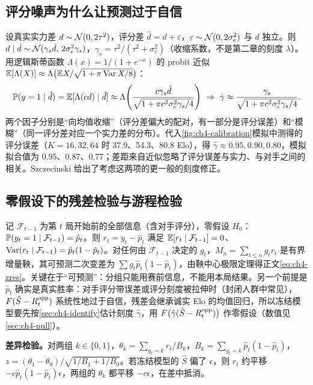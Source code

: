 \subsection{评分噪声为什么让预测过于自信}
\label{app:ch4-overconf}

设真实实力差 $d\sim\mathcal{N}(0,2\tau^2)$，评分差 $\hat d=d+\varepsilon$，$\varepsilon\sim\mathcal{N}(0,2\sigma_e^2)$ 与 $d$ 独立。则 $d\mid\hat d\sim\mathcal{N}(\gamma_s\hat d,\,2\sigma_e^2\gamma_s)$，$\gamma_s=\tau^2/(\tau^2+\sigma_e^2)$（收缩系数，不是第二章的刻度 $\lambda$）。用逻辑斯蒂函数 $\Lambda(x)=1/(1+e^{-x})$ 的 probit 近似 $\mathbb{E}[\Lambda(X)]\approx\Lambda\bigl(\mathbb{E} X/\sqrt{1+\pi\operatorname{Var} X/8}\bigr)$：
\[
\mathbb{P}(y=1\mid\hat d)=\mathbb{E}[\Lambda(cd)\mid\hat d]\approx\Lambda\!\left(\frac{c\gamma_s\hat d}{\sqrt{1+\pi c^2\sigma_e^2\gamma_s/4}}\right)
\ \Rightarrow\ \hat\gamma\approx\frac{\gamma_s}{\sqrt{1+\pi c^2\sigma_e^2\gamma_s/4}}.
\]
两个因子分别是“向均值收缩”（评分差偏大的配对，有一部分是评分误差）和“模糊”（同一评分差对应一个实力差的分布）。代入\cref{fig:ch4-calibration}模拟中测得的评分误差（$K=16,32,64$ 时 37.9、54.3、80.8 Elo），得 $\hat\gamma\approx0.95,0.90,0.80$，模拟拟合值为 0.95、0.87、0.77；差距来自近似忽略了评分误差与实力、与对手之间的相关。Szczecinski 给出了考虑这两项的更一般的刻度修正\cite{szczecinski2026new}。

\subsection{零假设下的残差检验与游程检验}
\label{app:ch4-tests}

记 $\mathcal F_{t-1}$ 为第 $t$ 局开始前的全部信息（含对手评分），零假设 $H_0$：$\mathbb{P}(y_t=1\mid\mathcal F_{t-1})=\hat p_t$。则 $r_t=y_t-\hat p_t$ 满足 $\mathbb{E}[r_t\mid\mathcal F_{t-1}]=0$、$\operatorname{Var}(r_t\mid\mathcal F_{t-1})=\hat p_t(1-\hat p_t)$。对任何由 $\mathcal F_{t-1}$ 决定的 $g_t$，$M_n=\sum_{t\le n}g_tr_t$ 是有界增量鞅，其可预测二次变差为 $\sum g_t\hat p_t(1-\hat p_t)$，由鞅中心极限定理得正文\cref{eq:ch4-zres}。关键在于“可预测”：分组只能用赛前信息，不能用本局结果。另一个前提是 $\hat p_t$ 确实是真实胜率：对手评分带误差或评分刻度被拉伸时（封闭人群中常见），$F(\hat S-R^{\mathrm{opp}}_t)$ 系统性地过于自信，残差会继承诚实 Elo 的均值回归，所以冻结模型要先按\cref{sec:ch4-identify}估计刻度 $\hat\gamma$，用 $F\big(\hat\gamma(\hat S-R^{\mathrm{opp}}_t)\big)$ 作零假设（数值见\cref{sec:ch4-null}）。

\textbf{差异检验。}对两组 $k\in\{0,1\}$，$\theta_k=\sum_{g_t=k}r_t/B_k$，$B_k=\sum_{g_t=k}\hat p_t(1-\hat p_t)$，$z=(\theta_1-\theta_0)/\sqrt{1/B_1+1/B_0}$。若冻结模型的 $\hat S$ 偏了 $\epsilon$，则 $r_t$ 约平移 $-c\hat p_t(1-\hat p_t)\epsilon$，两组的 $\theta_k$ 都平移 $-c\epsilon$，在差中抵消。

